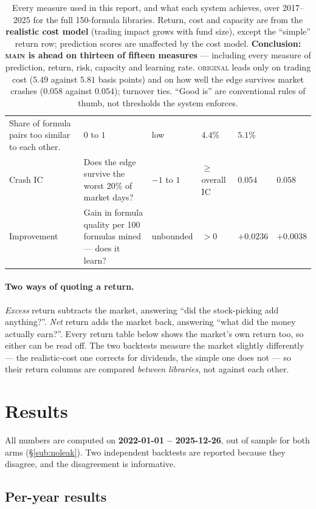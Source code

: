 \documentclass[11pt]{article}
\newcommand{\main}{\textsc{main}}
\newcommand{\orig}{\textsc{original}}
\begin{document}
\begin{table}[h]
\begin{tabular}{@{}p{1.75cm}p{4.5cm}p{1.75cm}p{1.5cm}p{1.9cm}p{1.9cm}@{}}
Share of formula pairs too similar to each other. &
$0$ to $1$ &
low &
$\bm{4.4\%}$ & $5.1\%$ \\
Crash IC &
Does the edge survive the worst $20\%$ of market days? &
$-1$ to $1$ &
$\ge$ overall IC &
$0.054$ & $\bm{0.058}$ \\
Improvement &
Gain in formula quality per 100 formulas mined --- does it learn? &
unbounded &
$>0$ &
$\bm{+0.0236}$ & $+0.0038$ \\
\bottomrule
\end{tabular}
\caption{Every measure used in this report, and what each system achieves, over
2017--2025 for the full 150-formula libraries. Return, cost and capacity are from the
\textbf{realistic cost model} (trading impact grows with fund size), except the
``simple'' return row; prediction scores are unaffected by the cost model.
\textbf{Conclusion: \main{} is ahead on thirteen of fifteen measures} --- including
every measure of prediction, return, risk, capacity and learning rate. \orig{} leads
only on trading cost ($5.49$ against $5.81$ basis points) and on how well the edge
survives market crashes ($0.058$ against $0.054$); turnover ties. ``Good is'' are
conventional rules of thumb, not thresholds the system enforces.}
\label{tab:metrics}
\end{table}

\paragraph{Two ways of quoting a return.}
\emph{Excess} return subtracts the market, answering ``did the stock-picking add
anything?''. \emph{Net} return adds the market back, answering ``what did the money
actually earn?''. Every return table below shows the market's own return too, so
either can be read off. The two backtests measure the market slightly differently ---
the realistic-cost one corrects for dividends, the simple one does not --- so their
return columns are compared \emph{between libraries}, not against each other.

\section{Results}
\label{sec:results}
All numbers are computed on \textbf{2022-01-01 -- 2025-12-26}, out of sample for both
arms (\S\ref{sub:noleak}). Two independent backtests are reported because they
disagree, and the disagreement is informative.

\subsection{Per-year results}
\end{document}
